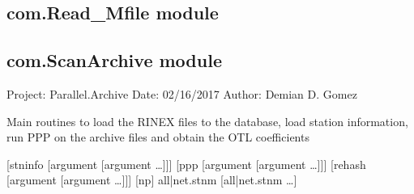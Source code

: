 \documentclass[letterpaper,10pt,english]{sphinxmanual}
\begin{document}
\subsection{com.Read\_M\sphinxhyphen{}file module}
\label{\detokenize{com:com-read-m-file-module}}

\subsection{com.ScanArchive module}
\label{\detokenize{com:module-com.ScanArchive}}\label{\detokenize{com:com-scanarchive-module}}
\sphinxAtStartPar
Project: Parallel.Archive
Date: 02/16/2017
Author: Demian D. Gomez

\sphinxAtStartPar
Main routines to load the RINEX files to the database, load station
information, run PPP on the archive files and obtain the OTL coefficients
\begin{description}
\sphinxAtStartPar
{[}\sphinxhyphen{}stninfo {[}argument {[}argument …{]}{]}{]}
{[}\sphinxhyphen{}ppp {[}argument {[}argument …{]}{]}{]}
{[}\sphinxhyphen{}rehash {[}argument {[}argument …{]}{]}{]} {[}\sphinxhyphen{}np{]}
all|net.stnm {[}all|net.stnm …{]}

\end{description}
\end{document}

